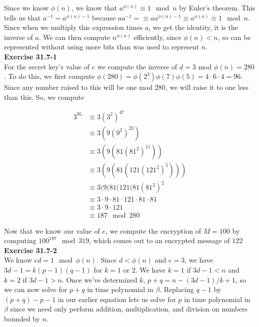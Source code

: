 \documentclass{article}
\begin{document}
Since we know $\phi(n)$, we know that $a^{\phi(n)} \equiv 1 \mod n$ by Euler's theorem. This tells us that $a^{-1} = a^{\phi(n) - 1}$ because $aa^{-1} =\equiv a a^{\phi(n) -1} \equiv a^{\phi(n)} \equiv 1 \mod n$. Since when we multiply this expression times $a$, we get the identity, it is the inverse of $a$. We can then compute $n^{\phi(n)}$ efficiently, since $\phi(n) < n$, so can be represented without using more bits than was used to represent $n$.\\



\noindent\textbf{Exercise 31.7-1}\\

For the secret key's value of $e$ we compute the inverse of $d=3$ mod $\phi(n) = 280$. To do this, we first compute $\phi(280) = \phi(2^3)\phi(7)\phi(5) = 4\cdot 6\cdot 4 = 96$. Since any number raised to this will be one mod 280, we will raise it to one less than this. So, we compute 

\begin{align*}
3^{95} &\equiv 3 (3^2)^{47} \\
&\equiv 3(9(9^2)^{23})\\
& \equiv 3(9(81(81^2)^{11}))\\
& \equiv 3(9(81(121(121^2)^5)))\\
& \equiv 3(9(81(121(81(81^2)^2\\
& \equiv 3\cdot 9\cdot 81 \cdot 121 \cdot 81 \cdot81\\
& \equiv 3\cdot 9 \cdot 121 \\
& \equiv 187 \mod 280
\end{align*}

Now that we know our value of $e$, we compute the encryption of $M=100$ by computing $100^{187} \mod 319$, which comes out to an encrypted message of $122$\\

\noindent\textbf{Exercise 31.7-2}\\

We know $ed = 1 \mod \phi(n)$.  Since $d < \phi(n)$ and $e = 3$, we have $3d-1 = k(p-1)(q-1)$ for $k=1$ or $2$. We have $k=1$ if $3d-1 < n$ and $k=2$ if $3d-1 > n$.  Once we've determined $k$, $p+q = n - (3d-1)/k + 1$, so we can now solve for $p+q$ in time polynomial in $\beta$.  Replacing $q-1$ by $(p+q) -p-1$ in our earlier equation lets us solve for $p$ in time polynomial in $\beta$ since we need only perform addition, multiplication, and division on numbers bounded by $n$. \\
\end{document}

